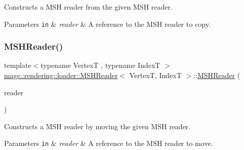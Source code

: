 Constructs a M\+SH reader from the given M\+SH reader.


\begin{DoxyParams}[1]{Parameters}
\mbox{\tt in}  & {\em reader} & A reference to the M\+SH reader to copy. \\
\hline
\end{DoxyParams}
\hypertarget{classmage_1_1rendering_1_1loader_1_1_m_s_h_reader_a107ac854c231c1a1c39f30c5199dcec7}{}\label{classmage_1_1rendering_1_1loader_1_1_m_s_h_reader_a107ac854c231c1a1c39f30c5199dcec7} 
\subsubsection{\texorpdfstring{M\+S\+H\+Reader()}{MSHReader()}\hspace{0.1cm}{\footnotesize\ttfamily [3/3]}}
{\footnotesize\ttfamily template$<$typename VertexT , typename IndexT $>$ \\
\hyperlink{classmage_1_1rendering_1_1loader_1_1_m_s_h_reader}{mage\+::rendering\+::loader\+::\+M\+S\+H\+Reader}$<$ VertexT, IndexT $>$\+::\hyperlink{classmage_1_1rendering_1_1loader_1_1_m_s_h_reader}{M\+S\+H\+Reader} (\begin{DoxyParamCaption}\item[{\hyperlink{classmage_1_1rendering_1_1loader_1_1_m_s_h_reader}{M\+S\+H\+Reader}$<$ VertexT, IndexT $>$ \&\&}]{reader }\end{DoxyParamCaption})\hspace{0.3cm}{\ttfamily [noexcept]}}

Constructs a M\+SH reader by moving the given M\+SH reader.


\begin{DoxyParams}[1]{Parameters}
\mbox{\tt in}  & {\em reader} & A reference to the M\+SH reader to move. \\
\hline
\end{DoxyParams}
\hypertarget{classmage_1_1rendering_1_1loader_1_1_m_s_h_reader_af45daf383d4e94586b5d2968d5357fce}{}\label{classmage_1_1rendering_1_1loader_1_1_m_s_h_reader_af45daf383d4e94586b5d2968d5357fce} 

